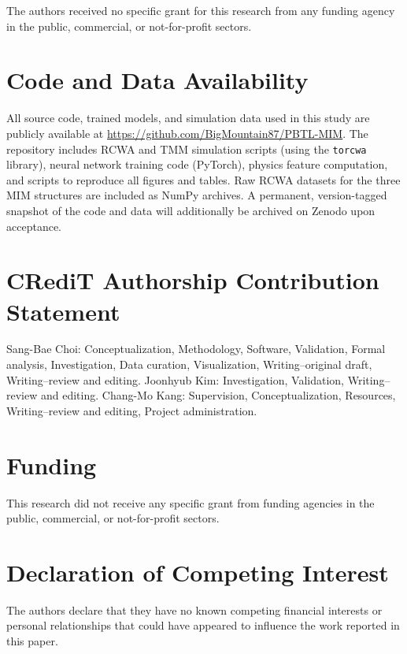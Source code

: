 \documentclass[a4paper,fleqn]{cas-sc}
\begin{document}
The authors received no specific grant for this research from any funding agency in the public, commercial, or not-for-profit sectors.

\section*{Code and Data Availability}

All source code, trained models, and simulation data used in this study are publicly available at \url{https://github.com/BigMountain87/PBTL-MIM}. The repository includes RCWA and TMM simulation scripts (using the \texttt{torcwa} library), neural network training code (PyTorch), physics feature computation, and scripts to reproduce all figures and tables. Raw RCWA datasets for the three MIM structures are included as NumPy archives. A permanent, version-tagged snapshot of the code and data will additionally be archived on Zenodo upon acceptance.

\section*{CRediT Authorship Contribution Statement}

Sang-Bae Choi: Conceptualization, Methodology, Software, Validation, Formal analysis, Investigation, Data curation, Visualization, Writing--original draft, Writing--review and editing. Joonhyub Kim: Investigation, Validation, Writing--review and editing. Chang-Mo Kang: Supervision, Conceptualization, Resources, Writing--review and editing, Project administration.

\section*{Funding}

This research did not receive any specific grant from funding agencies in the public, commercial, or not-for-profit sectors.

\section*{Declaration of Competing Interest}

The authors declare that they have no known competing financial interests or personal relationships that could have appeared to influence the work reported in this paper.
\end{document}
